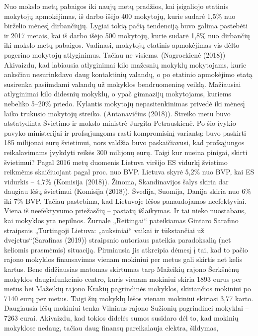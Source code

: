 \documentclass[]{article}
\begin{document}
Nuo mokslo metų pabaigos iki naujų metų pradžios, kai įsigaliojo
etatinis mokytojų apmokėjimas, iš darbo išėjo 400 mokytojų, kurie sudarė
1,5\% nuo birželio mėnesį dirbančiųjų. Lygiai tokią pačią tendenciją
buvo galima pastebėti ir 2017 metais, kai iš darbo išėjo 500 mokytojų,
kurie sudarė 1,8\% nuo dirbančių iki mokslo metų pabaigos. Vadinasi,
mokytojų etatinis apmokėjimas vis dėlto pagerino mokytojų atlyginimus.
Tačiau ne visiems. (Nagrockienė (2018)) Akivaizdu, kad labiausia
atlyginimai kilo mažesnių mokyklų mokytojams, kurie anksčiau
nesurinkdavo daug kontaktinių valandų, o po etatinio apmokėjimo etatą
susirenka pasiimdami valandų už mokyklos bendruomeninę veiklą.
Mažiausiai atlyginimai kilo didesnių mokyklų, o ypač gimnazijų
mokytojams, kuriems nebeliko 5--20\% priedo. Kylantis mokytojų
nepasitenkinimas privedė iki mėnesį laiko trukusio mokytojų streiko.
(Antanavičius (2018)). Streiko metu buvo atstatydinta Švietimo ir mokslo
ministrė Jurgita Petrauskienė. Po šio įvykio pavyko ministerijai ir
profsąjungoms rasti kompromisinį variantą: buvo paskirti 185 milijonai
eurų švietimui, nors valdžia buvo paskaičiavusi, kad profsąjungos
reikalavimams įvykdyti reikės 300 milijonų eurų. Taigi kur nueina
pinigai, skirti švietimui? Pagal 2016 metų duomenis Lietuva viršijo ES
vidurkį švietimo reikmėms skaičiuojant pagal proc. nuo BVP. Lietuva
skyrė 5,2\% nuo BVP, kai ES vidurkis -- 4,7\% (Komisija (2018)). Žinoma,
Skandinavijos šalys skiria dar daugiau lėšų švietimui (Komisija (2018)).
Švedija, Suomija, Danija skiria nuo 6\% iki 7\% BVP. Tačiau pastebima,
kad Lietuvoje lėšos panaudojamos neefektyviai. Viena iš neefektyvumo
priežasčių -- pastatų išlaikymas. Ir tai nieko nuostabaus, kai mokyklos
yra nepilnos. Žurnale „Reitingai`` pateikiamas Gintaro Sarafino
straipsnis „Turtingoji Lietuva: „auksiniai`` vaikai ir tūkstančiai už
dvejetus``(Sarafinas (2019)) straipsnio autoriaus pateikia paradoksalią
(net keliomis prasmėmis) situaciją. Pirmiausia jis atkreipia dėmesį į
tai, kad to pačio rajono mokyklos finansavimas vienam mokiniui per metus
gali skirtis net kelis kartus. Bene didžiausias matomas skirtumas tarp
Mažeikių rajono Šerkšnėnų mokyklos daugiafunkcinio centro, kuris vienam
mokiniui skiria 1893 eurus per metus bei Mažeikių rajono Krakių
pagrindinės mokyklos, skiriančios mokiniui po 7140 eurų per metus. Taigi
šių mokyklų lėšos vienam mokiniui skiriasi 3,77 karto. Daugiausia lėšų
mokiniui tenka Vilniaus rajono Sužionių pagrindinei mokyklai -- 7263
eurai. Akivaizdu, kad tokios didelės sumos susidaro dėl to, kad mokinių
mokyklose nedaug, tačiau daug finansų pareikalauja elektra, šildymas,
\end{document}
